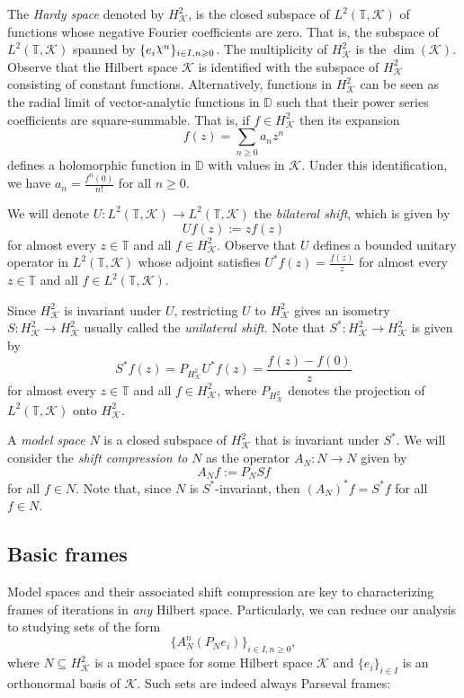 \documentclass[a4paper,12pt]{amsart}
\def\D{{\mathbb{D}}}
\def\KK{{\mathcal{K}}}
\def\T{{\mathbb{T}}}
\DeclareRobustCommand{\rchi}{{\mathpalette\irchi\relax}}
\newcommand{\irchi}[2]{\raisebox{\depth}{$#1\chi$}} %
\theoremstyle{definition}
\begin{document}
The {\em Hardy space}  denoted by $H^2_\KK$, is the closed subspace of $L^2(\T,\KK)$ of functions whose negative Fourier coefficients are zero. That is, the subspace of $L^2(\T,\KK)$ spanned by $\{e_i\rchi^n\}_{i\in I,n\geqslant0}$. The multiplicity of $H^2_{\KK}$ is the $\dim(\KK)$. Observe that the Hilbert space $\KK$ is identified with the subspace of $H^2_{\KK}$ consisting of constant functions. Alternatively, functions in $H^2_\KK$ can be seen as the radial limit of vector-analytic functions in $\D$ such that  their power series coefficients are square-summable. That is, if $f\in H^2_\KK$ then its expansion
\begin{equation*}
f(z)=\sum_{n\geqslant0}a_nz^n
\end{equation*}
defines a holomorphic function in $\D$ with values in $\KK$. Under this identification, we have $a_n=\frac{f^n(0)}{n!}$ for all $n\geqslant0$.

We will denote $U:L^2(\T,\KK)\to L^2(\T,\KK)$ the {\em bilateral shift}, which is given by
\begin{equation*}
Uf(z):=zf(z)
\end{equation*}
for almost every $z\in\T$ and all $f\in H^2_\KK$. Observe that $U$ defines a bounded unitary operator in $L^2(\T,\KK)$ whose adjoint satisfies $U^*f(z)=\frac{f(z)}{z}$ for almost every $z\in\T$ and all $f\in L^2(\T,\KK)$. 

Since $H^2_\KK$ is invariant under $U$, restricting $U$ to ${H^2_\KK}$ gives an isometry $S:H^2_\KK\to H^2_\KK$ usually called the {\em unilateral shift}. Note that $S^*:H^2_\KK\to H^2_\KK$ is given by 
\begin{equation*}
S^*f(z)=P_{H^2_\KK}U^*f(z)=\dfrac{f(z)-f(0)}{z}
\end{equation*}
for almost every $z\in\T$ and all $f\in H^2_\KK$, where $P_{H^2_\KK}$ denotes the projection of $L^2(\T,\KK)$ onto $H^2_\KK$.

A {\em model space} $N$ is a closed subspace of $H^2_\KK$ that is invariant under $S^*$. We will consider the {\em shift compression to} $N$ as the operator $A_N:N\to N$ given by
\begin{equation*}
A_Nf:=P_NSf
\end{equation*}
for all $f\in N$. Note that, since $N$ is $S^*$-invariant, then $(A_N)^*f=S^*f$ for all $f\in N$.



\subsection{Basic frames}
Model spaces and their associated shift compression are key to characterizing frames of iterations in {\em any} Hilbert space. Particularly, we can reduce our analysis to studying sets of the form 
\begin{equation*}
\{A_N^n(P_Ne_i)\}_{i\in I,n\geqslant0},
\end{equation*}
where $N\subseteq H^2_\KK$ is a model space for some Hilbert space $\KK$ and $\{e_i\}_{i\in I}$ is an orthonormal basis of $\KK$. Such sets are indeed always Parseval frames:
\end{document}
